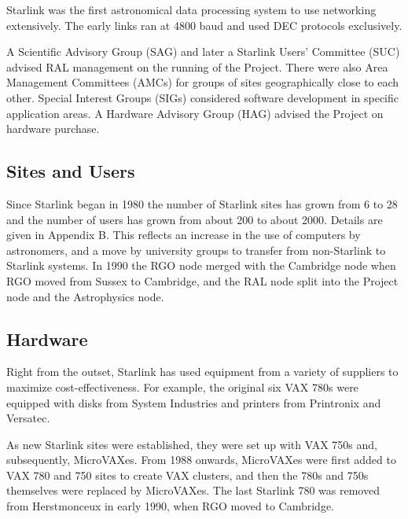 \documentclass[twoside,11pt]{article}
\newenvironment{latexonly}{}{}
\begin{document}
Starlink was the first astronomical data processing system to use networking
extensively.
The early links ran at 4800 baud and used DEC protocols exclusively.

A Scientific Advisory Group (SAG) and later a Starlink Users' Committee (SUC)
advised RAL management on the running of the Project.
There were also Area Management Committees (AMCs) for groups of sites
geographically close to each other.
Special Interest Groups (SIGs) considered software development in specific
application areas.
A Hardware Advisory Group (HAG) advised the Project on hardware purchase.

\subsection*{Sites and Users}

Since Starlink began in 1980 the number of Starlink sites has grown from 6
to 28 and the number of users has grown from about 200 to about 2000.
\begin{latexonly}
Details are given in Appendix B.
\end{latexonly}
This reflects an increase in the use of computers by astronomers, and a
move by university groups to transfer from non-Starlink to Starlink systems.
In 1990 the RGO node merged with the Cambridge node when RGO moved from
Sussex to Cambridge, and the RAL node split into the Project node and the
Astrophysics node.

\subsection*{Hardware}

Right from the outset, Starlink has used equipment from a variety of suppliers
to maximize cost-effectiveness.
For example, the original six VAX 780s were equipped with disks from System
Industries and printers from Printronix and Versatec.
 
As new Starlink sites were established, they were set up with VAX 750s and,
subsequently, MicroVAXes.
From 1988 onwards, MicroVAXes were first added to VAX 780 and 750 sites to
create VAX clusters, and then the 780s and 750s themselves were replaced by
MicroVAXes.
The last Starlink 780 was removed from Herstmonceux in early 1990, when RGO
moved to Cambridge.
 
\end{document}
